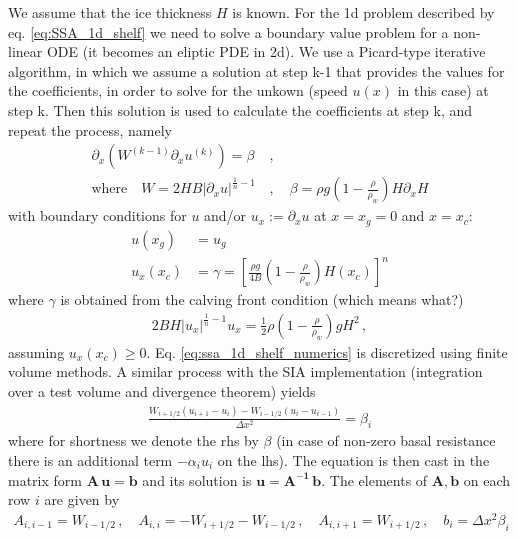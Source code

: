 \documentclass[11pt,a4paper]{article}
\newcommand{\p}{\partial}
\begin{document}
We assume that the ice thickness $H$ is known. For the 1d problem described by eq. \eqref{eq:SSA_1d_shelf} we need to solve a boundary value problem for a non-linear ODE (it becomes an eliptic PDE in 2d). We use a Picard-type iterative algorithm, in which we assume a solution at step k-1 that provides the values for the coefficients, in order to solve for the unkown (speed $u(x)$ in this case) at step k. Then this solution is used to calculate the coefficients at step k, and repeat the process, namely
\begin{align}
    \p_x \left(W^{(k-1)} \p_x u^{(k)} \right) = \beta
    &\,,
    \label{eq:ssa_1d_shelf_numerics}
    \\
    \text{where} \quad
    W = 2 H B |\p_x u|^{\frac{1}{n}-1}
    &\,,
    \quad
    \beta = \rho g (1-\frac{\rho}{\rho_w})H \p_x H
    \nonumber
\end{align}
with boundary conditions for $u$ and/or $u_x := \p_x u$ at $x=x_g = 0$ and $x=x_c$:
\begin{align*}
    u(x_g) &= u_g 
    \,\ \\
    u_x(x_c) &= \gamma = \left[ \frac{\rho g}{4 B} \left(1 - \frac{\rho}{\rho_w}\right) H(x_c)\right]^n
\end{align*}
where $\gamma$ is obtained from the calving front condition (which means what?)
\begin{align*}
    2 B H |u_x|^{\frac{1}{n}-1} u_x = \frac{1}{2} \rho \left(1 - \frac{\rho}{\rho_w}\right) g H^2
    \,,
\end{align*}
assuming $u_x(x_c) \geq 0$. Eq. \eqref{eq:ssa_1d_shelf_numerics} is discretized using finite volume methods. A similar process with the SIA implementation (integration over a test volume and divergence theorem) yields
\begin{align}
    \frac{W_{i+1/2}(u_{i+1}-u_i) - W_{i-1/2}(u_i - u_{i-1})}{\Delta x^2} = \beta_i
    \label{eq:ssa_1d_shelf_numerics_discretized}
\end{align}
where for shortness we denote the rhs by $\beta$ (in case of non-zero basal resistance there is an additional term $-\alpha_i u_i$ on the lhs). The equation is then cast in the matrix form $\mathbf{A \, u = b}$ and its solution is $\mathbf{ u = A^{-1} \,b}$. The elements of $\mathbf{A,b}$ on each row $i$ are given by
\begin{align*}
    A_{i,i-1} = W_{i-1/2}
    \,,
    \quad
    A_{i,i} = - W_{i+1/2} - W_{i-1/2}
    \,,
    \quad
    A_{i,i+1} = W_{i+1/2}
    \,,
    \quad
    b_{i} = \Delta x^2 \beta_i 
\end{align*}
\end{document}
